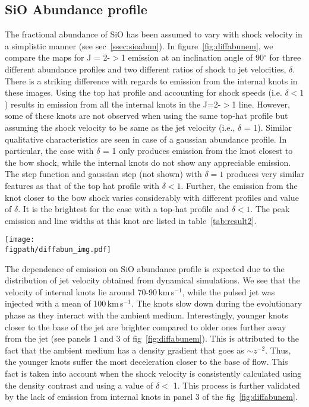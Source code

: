\documentclass[useAMS,usenatbib]{mn2e}
\newcommand{\figpath}{/Users/bhargavvaidya/MyProject/work/Leeds_Uni/SiOJets_New/PAPER/PFIGS/}
\begin{document}
\subsection{SiO Abundance profile}
\label{ssec:sioabunem}
The fractional abundance of SiO has been assumed to vary with shock velocity in
a simplistic manner (see sec~\ref{ssec:sioabun}). In
figure~\ref{fig:diffabunem}, we compare the maps for J = 2-$>$1
emission at an inclination angle of 90$^{\circ}$ for three different abundance profiles and two different ratios of shock to
jet velocities, $\delta$. There is a striking difference with regards to
emission from the internal knots in these images. Using the top hat profile
and accounting for shock speeds (i.e. $\delta < 1$) results in
emission from  all the internal knots in the J=2-$>$1 line. However, some of
these knots are not observed when using the same top-hat profile but
assuming the shock velocity to be same as the jet velocity (i.e.,
$\delta$ = 1). Similar qualitative characteristics are seen in case of a gaussian
abundance profile. In particular, the case with $\delta$ = 1 only
produces emission from the knot closest to the bow shock, while the internal
knots do not show any appreciable emission. The step function and
gaussian step (not shown) with $\delta = 1$ produces very similar
features as that of the top hat profile with $\delta < 1$.
Further, the emission from
the knot closer to the bow shock varies considerably with different
profiles and value of $\delta$. It is the brightest for the case with
a top-hat profile and $\delta < 1$. The peak emission and line widths at this knot
are listed in table~\ref{tab:result2}.
%

\begin{figure*}
 \texttt{[image: \\figpath/diffabun\_img.pdf]}%
 \caption{Variation of 2-$>$1 SiO emission for runs with molecular
   cooling having different abundance profiles.}
\label{fig:diffabunem}
\end{figure*}


The dependence of emission on SiO abundance profile is expected due to
the distribution of jet velocity obtained from dynamical
simulations. We see that the velocity of internal knots lie around
70-90\,km\,s$^{-1}$, while the pulsed jet was injected with a mean of
100\,km\,s$^{-1}$. The knots slow down during the evolutionary
phase as they interact with the ambient medium. Interestingly, younger
knots closer to the base of the jet are brighter compared to older
ones further away from the jet (see panels 1 and 3 of
fig~\ref{fig:diffabunem}). This is attributed to the fact that the
ambient medium has a density gradient that goes as $\sim
z^{-2}$. Thus, the younger knots suffer the most deceleration closer
to the base of flow. This fact is taken into account when the shock
velocity is consistently calculated using the density contrast and
using a value of $\delta <$ 1. This process is further validated by
the lack of emission from internal knots in panel 3 of the
fig~\ref{fig:diffabunem}. 
%
\end{document}
